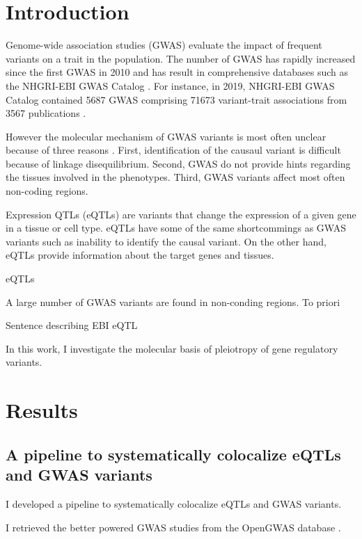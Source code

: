 \section*{Introduction}\label{sec:introduction}

Genome-wide association studies (GWAS) evaluate the impact of frequent variants on a trait in the population.
%
The number of GWAS has rapidly increased since the first GWAS in 2010 and has result in comprehensive databases such as the NHGRI-EBI GWAS Catalog \citep{2018.Parkinson.Buniello}.
%
For instance, in 2019, NHGRI-EBI GWAS Catalog contained 5687 GWAS comprising 71673 variant-trait associations from 3567 publications \citep{2018.Parkinson.Buniello}.

However the molecular mechanism of GWAS variants is most often unclear because of three reasons \citep{2020.Trynka.CanoGamez}.
%
First, identification of the causaul variant is difficult because of linkage disequilibrium.
%
Second, GWAS do not provide hints regarding the tissues involved in the phenotypes.
%
Third, GWAS variants affect most often non-coding regions.

Expression QTLs (eQTLs) are variants that change the expression of a given gene in a tissue or cell type.
%
eQTLs have some of the same shortcommings as GWAS variants such as inability to identify the causal variant.
%
On the other hand, eQTLs provide information about the target genes and tissues.

eQTLs 


A large number of GWAS variants are found in non-conding regions.
To priori

Sentence describing EBI eQTL

In this work, I investigate the molecular basis of pleiotropy of gene regulatory variants.

\section*{Results}\label{s:results}

\subsection*{A pipeline to systematically colocalize eQTLs and GWAS variants}

I developed a pipeline to systematically colocalize eQTLs and GWAS variants.

I retrieved the better powered GWAS studies from the OpenGWAS database \citep{2018.Parkinson.Buniello}.

